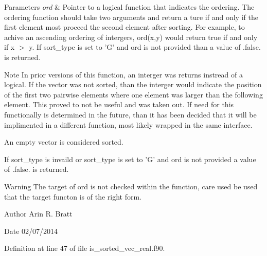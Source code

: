 \begin{DoxyParams}{Parameters}
{\em ord} & Pointer to a logical function that indicates the ordering. The ordering function should take two arguments and return a ture if and only if the first element most proceed the second element after sorting. For example, to achive an ascending ordering of intergers, ord(x,y) would return true if and only if x $>$ y. If sort\-\_\-type is set to 'G' and ord is not provided than a value of .false. is returned.\\
\hline
\end{DoxyParams}
\begin{DoxyNote}{Note}
In prior versions of this function, an interger was returns instread of a logical. If the vector was not sorted, than the interger would indicate the position of the first two pairwise elements where one element was larger than the following element. This proved to not be useful and was taken out. If need for this functionally is determined in the future, than it has been decided that it will be implimented in a different function, most likely wrapped in the same interface.

An empty vector is considered sorted.

If sort\-\_\-type is invaild or sort\-\_\-type is set to 'G' and ord is not provided a value of .false. is returned.
\end{DoxyNote}
\begin{DoxyWarning}{Warning}
The target of ord is not checked within the function, care used be used that the target functon is of the right form.
\end{DoxyWarning}
\begin{DoxyAuthor}{Author}
Arin R. Bratt 
\end{DoxyAuthor}
\begin{DoxyDate}{Date}
02/07/2014 
\end{DoxyDate}


Definition at line 47 of file is\-\_\-sorted\-\_\-vec\-\_\-real.\-f90.

